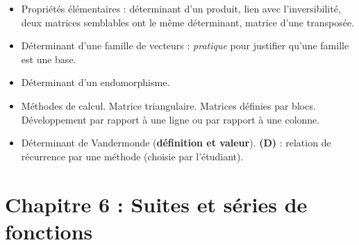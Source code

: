\documentclass[twoside,a4paper,french,10pt]{VcCours}
\begin{document}
\begin{enumerate}
\begin{itemize}
\item Propriétés élémentaires : déterminant d'un produit, lien avec l'inversibilité, deux matrices semblables ont le même déterminant, matrice d'une transposée.
\item Déterminant d'une famille de vecteurs : \textit{pratique} pour justifier qu'une famille est une base.
\item Déterminant d'un endomorphisme.
\item Méthodes de calcul. Matrice triangulaire. Matrices définies par blocs. Développement par rapport à une ligne ou par rapport à une colonne.
\item Déterminant de Vandermonde (\textbf{définition et valeur}). \textbf{(D)} : relation de récurrence par une méthode (choisie par l'étudiant).
\end{itemize} 
\end{enumerate}

\section*{Chapitre 6 : Suites et séries de fonctions}
\end{document}
